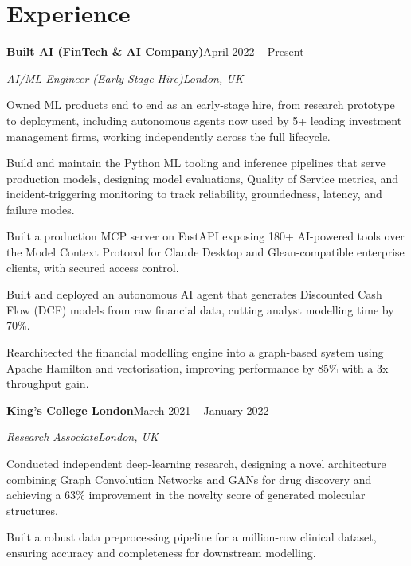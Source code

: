 \documentclass[10pt,a4paper]{article}
\newcommand{\entry}[4]{%
  {\color{company}\bfseries #1}\hfill {\color{muted}#2}\par
  \vspace{1pt}
  {\itshape #3}\hfill {\color{muted}\itshape #4}\par
  \vspace{3pt}%
}
\begin{document}
\section{Experience}
\entry{Built AI (FinTech \& AI Company)}{April 2022 -- Present}{AI/ML Engineer (Early Stage Hire)}{London, UK}
\begin{tight}
  \item Owned ML products end to end as an early-stage hire, from research prototype to deployment, including autonomous agents now used by 5+ leading investment management firms, working independently across the full lifecycle.
  \item Build and maintain the Python ML tooling and inference pipelines that serve production models, designing model evaluations, Quality of Service metrics, and incident-triggering monitoring to track reliability, groundedness, latency, and failure modes.
  \item Built a production MCP server on FastAPI exposing 180+ AI-powered tools over the Model Context Protocol for Claude Desktop and Glean-compatible enterprise clients, with secured access control.
  \item Built and deployed an autonomous AI agent that generates Discounted Cash Flow (DCF) models from raw financial data, cutting analyst modelling time by 70\%.
  \item Rearchitected the financial modelling engine into a graph-based system using Apache Hamilton and vectorisation, improving performance by 85\% with a 3x throughput gain.
\end{tight}

\entry{King's College London}{March 2021 -- January 2022}{Research Associate}{London, UK}
\begin{tight}
  \item Conducted independent deep-learning research, designing a novel architecture combining Graph Convolution Networks and GANs for drug discovery and achieving a 63\% improvement in the novelty score of generated molecular structures.
  \item Built a robust data preprocessing pipeline for a million-row clinical dataset, ensuring accuracy and completeness for downstream modelling.
\end{tight}

\end{document}
